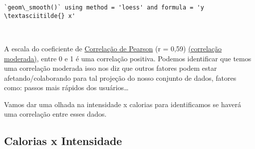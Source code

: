 \begin{Verbatim}[commandchars=\\\{\}]
    `geom\_smooth()` using method = 'loess' and formula = 'y \textasciitilde{} x'
\end{Verbatim}

\begin{center}
\end{center}
{ \hspace*{\fill} \\}

A escala do coeficiente de
\href{https://www.scribbr.com/statistics/pearson-correlation-coefficient/}{Correlação
    de Pearson} (r = 0,59)
\href{https://www.researchgate.net/figure/The-scale-of-Pearsons-Correlation-Coefficient_tbl1_345693737}{(correlação
    moderada)}, entre 0 e 1 é uma correlação positiva. Podemos identificar
que temos uma correlação moderada isso nos diz que outros fatores podem
estar afetando/colaborando para tal projeção do nosso conjunto de dados,
fatores como: passos mais rápidos dos usuários\ldots{}

Vamos dar uma olhada na intensidade x calorias para identificamos se
haverá uma correlação entre esses dados.

\subsection{Calorias x Intensidade}

